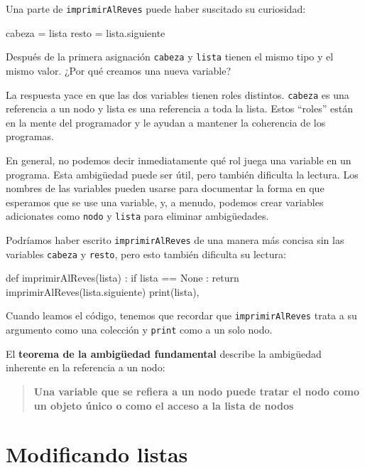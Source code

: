  

Una parte de \texttt{imprimirAlReves} puede haber suscitado su curiosidad:

\beforeverb 
\begin{pythoncode}
    cabeza = lista
    resto = lista.siguiente
\end{pythoncode}
\afterverb Después de la primera asignación \texttt{cabeza} y \texttt{lista}
tienen el mismo tipo y el mismo valor. ¿Por qué creamos una nueva
variable?

La respuesta yace en que las dos variables tienen roles distintos.
\texttt{cabeza} es una referencia a un nodo y lista es una referencia
a toda la lista. Estos ``roles'' están en la mente del programador
y le ayudan a mantener la coherencia de los programas.

 

En general, no podemos decir inmediatamente qué rol juega una variable
en un programa. Esta ambigüedad puede ser útil, pero también dificulta
la lectura. Los nombres de las variables pueden usarse para documentar
la forma en que esperamos que se use una variable, y, a menudo, podemos
crear variables adicionates como \texttt{nodo} y \texttt{lista} para
eliminar ambigüedades.

Podríamos haber escrito \texttt{imprimirAlReves} de una manera más
concisa sin las variables \texttt{cabeza} y \texttt{resto}, pero esto
también dificulta su lectura:

\beforeverb 
\begin{pythoncode}
def imprimirAlReves(lista) :
  if lista == None : 
     return
  imprimirAlReves(lista.siguiente)
  print(lista),
\end{pythoncode}
\afterverb Cuando leamos el código, tenemos que recordar que \texttt{imprimirAlReves}
trata a su argumento como una colección y \texttt{print} como a un
solo nodo.

El \textbf{teorema de la ambigüedad fundamental} describe la ambigüedad
inherente en la referencia a un nodo:
\begin{quote}
\textbf{Una variable que se refiera a un nodo puede tratar el nodo
como un objeto único o como el acceso a la lista de nodos} 
\end{quote}

\section{Modificando listas}

